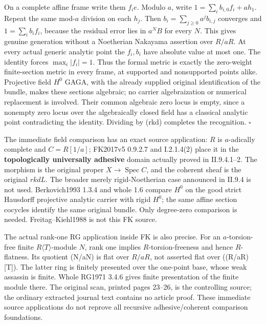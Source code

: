 \documentclass[
  11pt,
]{article}
\begin{document}
On a complete affine frame write them \(f_i e\). Modulo \(a\), write
\(1=\sum_i b_{i,0}f_i+a h_1\). Repeat the same mod-\(a\) division on
each \(h_j\). Then \(b_i=\sum_{j\geq0}a^jb_{i,j}\) converges and
\(1=\sum_i b_i f_i\), because the residual error lies in \(a^N B\) for
every \(N\). This gives genuine generation without a Noetherian Nakayama
assertion over \(R/aR\). At every actual generic analytic point the
\(f_i,b_i\) have absolute value at most one. The identity forces
\(\max_i|f_i|=1\). Thus the formal metric is exactly the zero-weight
finite-section metric in every frame, at supported and nonsupported
points alike. Projective field \(H^0\) GAGA, with the already supplied
original identification of the bundle, makes these sections algebraic;
no carrier algebraization or numerical replacement is involved. Their
common algebraic zero locus is empty, since a nonempty zero locus over
the algebraically closed field has a classical analytic point
contradicting the identity. Dividing by (rkd) completes the recognition.
\(\square\)

The immediate field comparison has an exact source application: \(R\) is
\(a\)-adically complete and \(C=R[1/a]\); FK2017v5 0.9.2.7 and
I.2.1.4(2) place it in the \textbf{topologically universally adhesive}
domain actually proved in II.9.4.1--2. The morphism is the original
proper \(X\to\operatorname{Spec}C\), and the coherent sheaf is the
original \(rkdL\). The broader merely rigid-Noetherian case announced in
II.9.4 is not used. Berkovich1993 1.3.4 and whole 1.6 compare \(H^0\) on
the good strict Hausdorff projective analytic carrier with rigid
\(H^0\); the same affine section cocycles identify the same original
bundle. Only degree-zero comparison is needed. Freitag--Kiehl1988 is not
this FK source.

The actual rank-one RG application inside FK is also precise. For an
\(a\)-torsion-free finite \(R\langle T\rangle\)-module \(N\), rank one
implies \(R\)-torsion-freeness and hence \(R\)-flatness. Its quotient
(N/aN) is flat over \(R/aR\), not asserted flat over ((R/aR){[}T{]}).
The latter ring is finitely presented over the one-point base, whose
weak assassin is finite. Whole RG1971 3.4.6 gives finite presentation of
the finite module there. The original scan, printed pages 23--26, is the
controlling source; the ordinary extracted journal text contains no
article proof. These immediate source applications do not reprove all
recursive adhesive/coherent comparison foundations.
\end{document}

